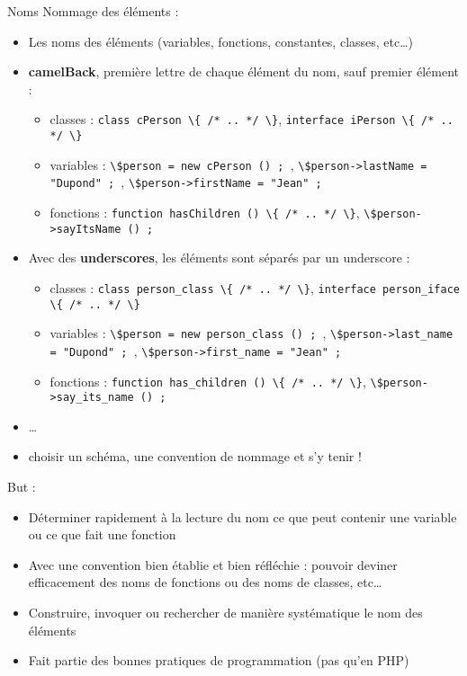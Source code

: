 \begin{frame}{Noms}
	Nommage des éléments :
	\begin{itemize}
		\item Les noms des éléments (variables, fonctions, constantes, classes, etc…)
		\item \textbf{camelBack}, première lettre de chaque élément du nom, sauf premier élément :
		\begin{itemize}
			\item classes : \lstinline&class cPerson \{ /* .. */ \}&, \lstinline&interface iPerson \{ /* .. */ \}&
			\item variables : \lstinline&\$person = new cPerson () ; &, \lstinline&\$person->lastName = "Dupond" ; &, \lstinline&\$person->firstName = "Jean" ;& 
			\item fonctions : \lstinline&function hasChildren () \{ /* .. */ \}&, \lstinline&\$person->sayItsName () ;&
		\end{itemize}
		\item Avec des \textbf{underscores}, les éléments sont séparés par un underscore :
		\begin{itemize}
			\item classes : \lstinline&class person_class \{ /* .. */ \}&, \lstinline&interface person_iface \{ /* .. */ \}&
			\item variables : \lstinline&\$person = new person_class () ; &, \lstinline&\$person->last_name = "Dupond" ; &, \lstinline&\$person->first_name = "Jean" ;& 
			\item fonctions : \lstinline&function has_children () \{ /* .. */ \}&, \lstinline&\$person->say_its_name () ;&
		\end{itemize}
		\item \ldots
		\item choisir un schéma, une convention de nommage et s’y tenir !
	\end{itemize}
	But :
	\begin{itemize}
		\item Déterminer rapidement à la lecture du nom ce que peut contenir une variable ou ce que fait une fonction
		\item Avec une convention bien établie et bien réfléchie : pouvoir deviner efficacement des noms de fonctions ou des noms de classes, etc…
		\item Construire, invoquer ou rechercher de manière systématique le nom des éléments
		\item Fait partie des bonnes pratiques de programmation (pas qu’en PHP)
	\end{itemize}
\end{frame}

